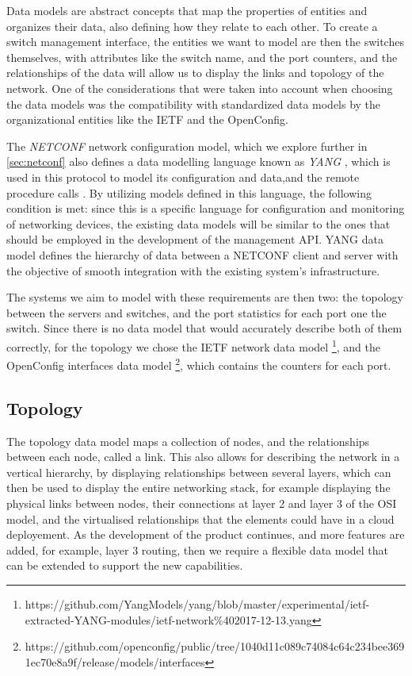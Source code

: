 Data models are abstract concepts that map the properties of entities and organizes their data, also defining how they relate to each other. To create a switch management interface, the entities we want to model are then 
the switches themselves, with attributes like the switch name, and the port counters, and the relationships of the data will allow us to display the links and topology of the network. One of the considerations that were taken into 
account when choosing the data models was the compatibility with standardized data models by the organizational entities like the IETF and the OpenConfig. 
\par The \textit{ NETCONF } network configuration model, which we explore further in \ref{sec:netconf} also defines a data modelling language known as \textit{ YANG }, which is used in this protocol to model its configuration 
and data,and the remote procedure calls \cite { CITE - rfc 6020 }. By utilizing models defined in this language, the following condition is met: since this is a specific language for configuration and monitoring of networking 
devices, the existing data models will be similar to the ones that should be employed in the development of the management API. YANG data model defines the hierarchy of data between a NETCONF client and server with the objective
of smooth integration with the existing system's infrastructure. 
\par The systems we aim to model with these requirements are then two: the topology between the servers and switches, and the port statistics for each port one the switch. Since there is no data model that would accurately describe
both of them correctly, for the topology we chose the IETF network data model \footnote {https://github.com/YangModels/yang/blob/master/experimental/ietf-extracted-YANG-modules/ietf-network\%402017-12-13.yang}, and the 
OpenConfig interfaces data model \footnote {https://github.com/openconfig/public/tree/1040d11c089c74084c64c234bee3691ec70e8a9f/release/models/interfaces}, which contains the counters for each port.

\subsection {Topology}

The topology data model maps a collection of nodes, and the relationships between each node, called a link. This also allows for describing the network in a vertical hierarchy, by displaying relationships between several layers,
which can then be used to display the entire networking stack, for example displaying the physical links between nodes, their connections at layer 2 and layer 3 of the OSI model, and the virtualised relationships that the elements 
could have in a cloud deployement. As the development of the product continues, and more features are added, for example, layer 3 routing, then we require a flexible data model that can be extended to support the new capabilities.

